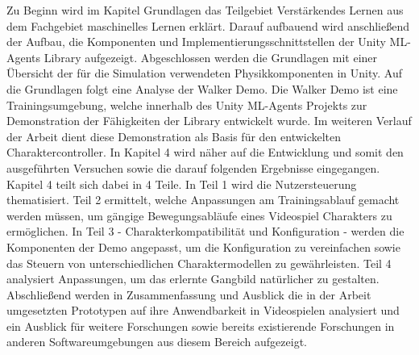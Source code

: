 Zu Beginn wird im Kapitel Grundlagen das Teilgebiet Verstärkendes Lernen aus dem Fachgebiet maschinelles Lernen erklärt. Darauf aufbauend wird anschließend der Aufbau, die Komponenten und Implementierungsschnittstellen der Unity ML-Agents Library aufgezeigt. Abgeschlossen werden die Grundlagen mit einer Übersicht der für die Simulation verwendeten Physikkomponenten in Unity. Auf die Grundlagen folgt eine Analyse der Walker Demo. Die Walker Demo ist eine Trainingsumgebung, welche innerhalb des Unity ML-Agents Projekts zur Demonstration der Fähigkeiten der Library entwickelt wurde. Im weiteren Verlauf der Arbeit dient diese Demonstration als Basis für den entwickelten Charaktercontroller. In Kapitel 4 wird näher auf die Entwicklung und somit den ausgeführten Versuchen sowie die darauf folgenden Ergebnisse eingegangen. Kapitel 4 teilt sich dabei in 4 Teile. In Teil 1 wird die Nutzersteuerung thematisiert. Teil 2 ermittelt, welche Anpassungen am Trainingsablauf gemacht werden müssen, um gängige Bewegungsabläufe eines Videospiel Charakters zu ermöglichen. In Teil 3 - Charakterkompatibilität und Konfiguration - werden die Komponenten der Demo angepasst, um die Konfiguration zu vereinfachen sowie das Steuern von unterschiedlichen Charaktermodellen zu gewährleisten. Teil 4 analysiert Anpassungen, um das erlernte Gangbild natürlicher zu gestalten. Abschließend werden in Zusammenfassung und Ausblick die in der Arbeit umgesetzten Prototypen auf ihre Anwendbarkeit in Videospielen analysiert und ein Ausblick für weitere Forschungen sowie bereits existierende Forschungen in anderen Softwareumgebungen aus diesem Bereich aufgezeigt.